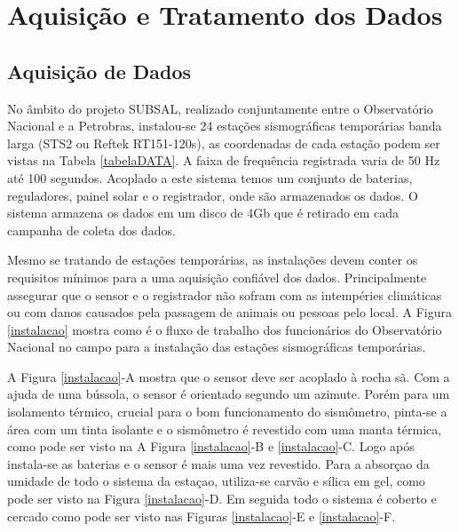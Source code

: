 \chapter{Aquisição e Tratamento dos Dados}
\section{Aquisição de Dados}

No âmbito do projeto SUBSAL, realizado conjuntamente entre o Observatório Nacional e a Petrobras,  instalou-se 24 estações sismográficas temporárias banda larga (STS2 ou Reftek RT151-120s), as coordenadas de cada estação podem ser vistas na Tabela \ref{tabelaDATA}. A faixa de frequência registrada varia de 50 Hz até 100 segundos. Acoplado a este sistema temos um conjunto de baterias, reguladores, painel solar e o registrador, onde são armazenados os dados. O sistema armazena os dados em um disco de 4Gb que é retirado em cada campanha de coleta dos dados.

Mesmo se tratando de estações temporárias, as instalações devem conter os requisitos mínimos para a uma aquisição confiável dos dados. Principalmente assegurar que o sensor e o registrador não sofram com as intempéries climáticas ou com danos causados pela passagem de animais ou pessoas pelo local. A Figura \ref{instalacao} mostra como é o fluxo de trabalho dos funcionários do Observatório Nacional no campo para a instalação das estações sismográficas temporárias. 

A Figura \ref{instalacao}-A mostra que o sensor deve ser acoplado à rocha sã. Com a ajuda de uma bússola, o sensor é orientado segundo um azimute.  Porém para um isolamento térmico, crucial para o bom funcionamento do sismômetro, pinta-se a área com um tinta isolante e o sismômetro é revestido com uma manta térmica, como pode ser visto na A Figura \ref{instalacao}-B e \ref{instalacao}-C. Logo após instala-se as baterias e o sensor é mais uma vez revestido. Para a absorçao da umidade de todo o sistema da estaçao, utiliza-se carvão e sílica em gel, como pode ser visto na Figura \ref{instalacao}-D. Em seguida todo o sistema é coberto e cercado como pode ser visto nas Figuras \ref{instalacao}-E e \ref{instalacao}-F.	  

